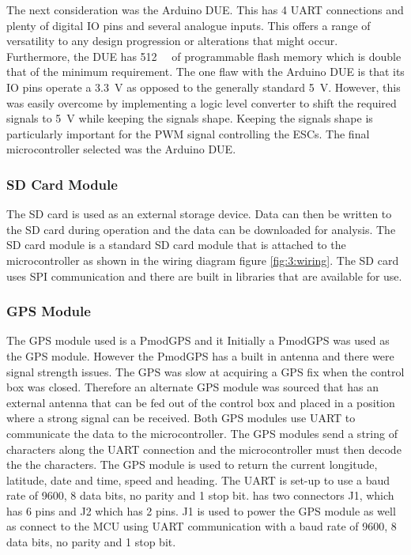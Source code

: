 		The next consideration was the Arduino DUE. This has 4 UART connections and plenty of digital IO pins and several analogue inputs. This offers a range of versatility to any design progression or alterations that might occur. Furthermore, the DUE has \SI{512}{\kilo\byte} of programmable flash memory which is double that of the minimum requirement. The one flaw with the Arduino DUE is that its IO pins operate a \SI{3.3}{\volt} as opposed to the generally standard \SI{5}{\volt}. However, this was easily overcome by implementing a logic level converter to shift the required signals to \SI{5}{\volt} while keeping the signals shape. Keeping the signals shape is particularly important for the PWM signal controlling the ESCs. The final microcontroller selected was the Arduino DUE.
		\subsubsection{SD Card Module}
		The SD card is used as an external storage device. Data can then be written to the SD card during operation and the data can be downloaded for analysis. The SD card module is a standard SD card module that is attached to the microcontroller as shown in the wiring diagram figure \ref{fig:3:wiring}. The SD card uses SPI communication and there are built in libraries that are available for use.
		\subsubsection{GPS Module}
		The GPS module used is a PmodGPS and it
		Initially a PmodGPS was used as the GPS module. However the PmodGPS has a built in antenna and there were signal strength issues. The GPS was slow at acquiring a GPS fix when the control box was closed. Therefore an alternate GPS module was sourced that has an external antenna that can be fed out of the control box and placed in a position where a strong signal can be received. Both GPS modules use UART to communicate the data to the microcontroller. The GPS modules send a string of characters along the UART connection and the microcontroller must then decode the the characters. The GPS module is used to return the current longitude, latitude, date and time, speed and heading. The UART is set-up to use a baud rate of 9600, 8 data bits, no parity and 1 stop bit.   
		has two connectors J1, which has 6 pins and J2 which has 2 pins. J1 is used to power the GPS module as well as connect to the MCU using UART communication with a baud rate of 9600, 8 data bits, no parity and 1 stop bit. 	
